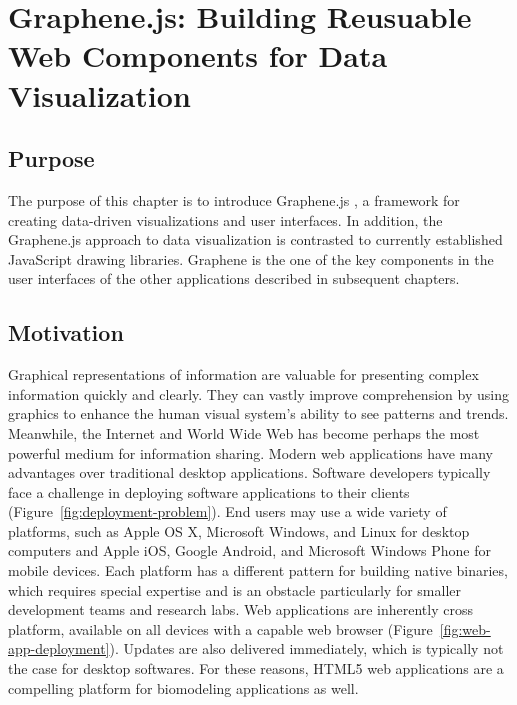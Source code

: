 \chapter{Graphene.js: Building Reusuable Web Components for Data Visualization}
\label{chap:graphene}

\section{Purpose}

The purpose of this chapter is to introduce Graphene.js \autocite{gu2014graphene}, a framework for creating data-driven visualizations and user interfaces.
In addition, the Graphene.js approach to data visualization is contrasted to currently established JavaScript drawing libraries.
Graphene is the one of the key components in the user interfaces of the other applications described in subsequent chapters.

\section{Motivation}

Graphical representations of information are valuable for presenting complex information quickly and clearly. \autocite{newsom2007public, smiciklas2012power, tufte1983visual}
They can vastly improve comprehension by using graphics to enhance the human visual system’s ability to see patterns and trends. \autocite{heer2010tour, sears2007human}
Meanwhile, the Internet and World Wide Web \autocite{berners2000weaving} has become perhaps the most powerful medium for information sharing. \autocite{bollacker1998citeseer, wilkinson2003motivations, page1999pagerank}
Modern web applications have many advantages over traditional desktop applications.
Software developers typically face a challenge in deploying software applications to their clients (Figure~\ref{fig:deployment-problem}).
End users may use a wide variety of platforms, such as Apple OS X, Microsoft Windows, and Linux for desktop computers and Apple iOS, Google Android, and Microsoft Windows Phone for mobile devices.
Each platform has a different pattern for building native binaries, which requires special expertise and is an obstacle particularly for smaller development teams and research labs.
Web applications are inherently cross platform, available on all devices with a capable web browser (Figure~\ref{fig:web-app-deployment}).
Updates are also delivered immediately, which is typically not the case for desktop softwares.
For these reasons, HTML5 web applications are a compelling platform for biomodeling applications as well.

